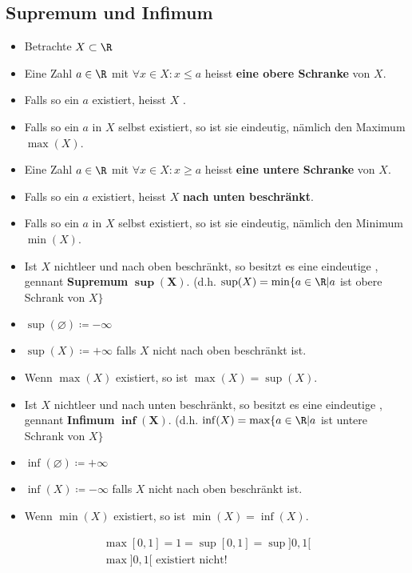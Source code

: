 \subsection{Supremum und Infimum}
\begin{itemize}
	\item Betrachte $X \subset \R$
	\item Eine Zahl $a \in \R$ mit $\forall x \in X : x \leq a$ heisst \textbf{eine obere Schranke} von $X$.
	\item Falls so ein $a$ existiert, heisst $X$ .
	\item Falls so ein $a$ in $X$ selbst existiert, so ist sie eindeutig, nämlich den Maximum $\max(X)$.
	
	\item Eine Zahl $a \in \R$ mit $\forall x \in X : x \geq a$ heisst \textbf{eine untere Schranke} von $X$.
	\item Falls so ein $a$ existiert, heisst $X$ \textbf{nach unten beschränkt}.
	\item Falls so ein $a$ in $X$ selbst existiert, so ist sie eindeutig, nämlich den Minimum $\min(X)$.
	
	\item Ist $X$ nichtleer und nach oben beschränkt, so besitzt es eine eindeutige , gennant \textbf{Supremum} $\mathbf{\sup(X)}$. (d.h. $\sup(X) = \min\{ a \in \R | a$ ist obere Schrank von $X \}$
	\item $\sup( \varnothing ) \coloneqq -\infty$
	\item $\sup(X) \coloneqq +\infty$ falls $X$ nicht nach oben beschränkt ist.
	\item Wenn $\max(X)$ existiert, so ist $\max(X) = \sup(X)$.
	
	\item Ist $X$ nichtleer und nach unten beschränkt, so besitzt es eine eindeutige , gennant \textbf{Infimum} $\mathbf{\inf(X)}$. (d.h. $\inf(X) = \max\{ a \in \R | a$ ist untere Schrank von $X \}$
	\item $\inf( \varnothing ) \coloneqq +\infty$
	\item $\inf(X) \coloneqq -\infty$ falls $X$ nicht nach oben beschränkt ist.
	\item Wenn $\min(X)$ existiert, so ist $\min(X) = \inf(X)$.
\end{itemize}
\begin{bsp*}
	\begin{gather*}
		\max [0,1] = 1 = \sup [0,1] = \sup ]0,1[ \\
		\max ]0,1[ \text{ existiert nicht!}
	\end{gather*}
\end{bsp*}

